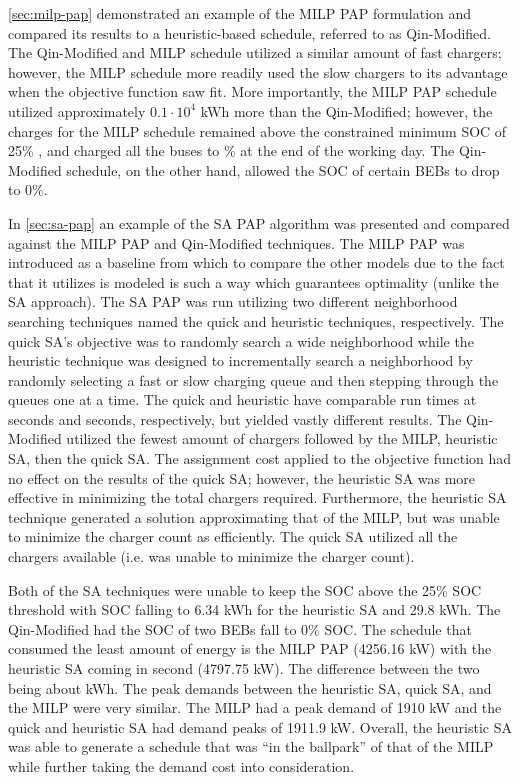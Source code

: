 \documentclass[ee,thesis]{usuthesis}
\newcommand{\bcharge}{0.7 }                                                     %
\newcommand{\mincharge}{25\% }                                                  %
\newcommand{\tempcnt}{9101 }                                                    %
\newcommand{\quicklocal}{0.25 }                                                %
\newcommand{\heuristiclocal}{0.4 }                                             %
\begin{document}
\ref{sec:milp-pap} demonstrated an example of the MILP PAP formulation and compared its results to a heuristic-based
schedule, referred to as Qin-Modified. The Qin-Modified and MILP schedule utilized a similar amount of fast chargers;
however, the MILP schedule more readily used the slow chargers to its advantage when the objective function saw fit.
More importantly, the MILP PAP schedule utilized approximately \(0.1\cdot10^4\) kWh more than the Qin-Modified; however, the
charges for the MILP schedule remained above the constrained minimum SOC of \mincharge, and charged all the buses to
\fpeval{\bcharge *100}\% at the end of the working day. The Qin-Modified schedule, on the other hand, allowed the SOC of
certain BEBs to drop to 0\%.

In \ref{sec:sa-pap} an example of the SA PAP algorithm was presented and compared against the MILP PAP and Qin-Modified
techniques. The MILP PAP was introduced as a baseline from which to compare the other models due to the fact that it
utilizes is modeled is such a way which guarantees optimality (unlike the SA approach). The SA PAP was run utilizing two
different neighborhood searching techniques named the quick and heuristic techniques, respectively. The quick SA's
objective was to randomly search a wide neighborhood while the heuristic technique was designed to incrementally search
a neighborhood by randomly selecting a fast or slow charging queue and then stepping through the queues one at a time.
The quick and heuristic have comparable run times at \fpeval{\quicklocal * \tempcnt} seconds and
\fpeval{\heuristiclocal * \tempcnt} seconds, respectively, but yielded vastly different results. The
Qin-Modified utilized the fewest amount of chargers followed by the MILP, heuristic SA, then the quick SA. The
assignment cost applied to the objective function had no effect on the results of the quick SA; however, the heuristic
SA was more effective in minimizing the total chargers required. Furthermore, the heuristic SA technique generated a
solution approximating that of the MILP, but was unable to minimize the charger count as efficiently. The quick SA
utilized all the chargers available (i.e. was unable to minimize the charger count).

Both of the SA techniques were unable to keep the SOC above the 25\% SOC threshold with SOC falling to 6.34 kWh for the
heuristic SA and 29.8 kWh. The Qin-Modified had the SOC of two BEBs fall to 0\% SOC. The schedule that consumed the least
amount of energy is the MILP PAP (4256.16 kW) with the heuristic SA coming in second (4797.75 kW). The difference
between the two being about  kWh. The peak demands between the heuristic SA, quick
SA, and the MILP were very similar. The MILP had a peak demand of 1910 kW and the quick and heuristic SA had demand
peaks of 1911.9 kW. Overall, the heuristic SA was able to generate a schedule that was ``in the ballpark'' of that of the
MILP while further taking the demand cost into consideration.
\end{document}
